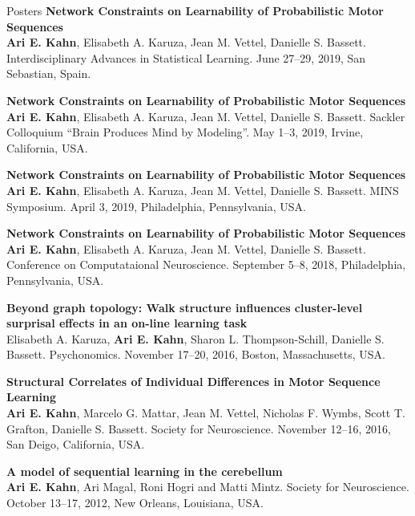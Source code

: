 \documentclass{resume} %
\begin{document}
\begin{rSection}{Posters}
\textbf{Network Constraints on Learnability of Probabilistic Motor Sequences} \\
\textbf{Ari E. Kahn}, Elisabeth A. Karuza, Jean M. Vettel, Danielle S. Bassett.
Interdisciplinary Advances in Statistical Learning. June 27--29, 2019, San Sebastian, Spain.

\textbf{Network Constraints on Learnability of Probabilistic Motor Sequences} \\
\textbf{Ari E. Kahn}, Elisabeth A. Karuza, Jean M. Vettel, Danielle S. Bassett.
Sackler Colloquium ``Brain Produces Mind by Modeling''. May 1--3, 2019, Irvine, California, USA.

\textbf{Network Constraints on Learnability of Probabilistic Motor Sequences} \\
\textbf{Ari E. Kahn}, Elisabeth A. Karuza, Jean M. Vettel, Danielle S. Bassett.
MINS Symposium. April 3, 2019, Philadelphia, Pennsylvania, USA.

\textbf{Network Constraints on Learnability of Probabilistic Motor Sequences} \\
\textbf{Ari E. Kahn}, Elisabeth A. Karuza, Jean M. Vettel, Danielle S. Bassett.
Conference on Computataional Neuroscience. September 5--8, 2018, Philadelphia, Pennsylvania, USA.

\textbf{Beyond graph topology: Walk structure influences cluster-level surprisal effects in an on-line learning task} \\
Elisabeth A. Karuza, \textbf{Ari E. Kahn}, Sharon L. Thompson-Schill, Danielle S. Bassett.
Psychonomics. November 17--20, 2016, Boston, Massachusetts, USA.

\textbf{Structural Correlates of Individual Differences in Motor Sequence Learning} \\
\textbf{Ari E. Kahn}, Marcelo G. Mattar, Jean M. Vettel, Nicholas F. Wymbs, Scott T. Grafton, Danielle S. Bassett.
Society for Neuroscience. November 12--16, 2016, San Deigo, California, USA.

\textbf{A model of sequential learning in the cerebellum} \\
\textbf{Ari E. Kahn}, Ari Magal, Roni Hogri and Matti Mintz.
Society for Neuroscience. October 13--17, 2012, New Orleans, Louisiana, USA.
\end{rSection}
\end{document}
